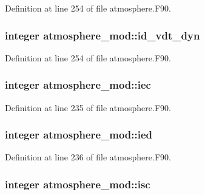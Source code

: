 Definition at line 254 of file atmosphere.\-F90.

\subsubsection[{id\-\_\-vdt\-\_\-dyn}]{\setlength{\rightskip}{0pt plus 5cm}integer atmosphere\-\_\-mod\-::id\-\_\-vdt\-\_\-dyn\hspace{0.3cm}{\ttfamily [private]}}\label{classatmosphere__mod_aa372781c11fb092462ce67e7d29f3cb0}


Definition at line 254 of file atmosphere.\-F90.

\subsubsection[{iec}]{\setlength{\rightskip}{0pt plus 5cm}integer atmosphere\-\_\-mod\-::iec\hspace{0.3cm}{\ttfamily [private]}}\label{classatmosphere__mod_ab0f4510c9097aa7a29c57c545aa02976}


Definition at line 235 of file atmosphere.\-F90.

\subsubsection[{ied}]{\setlength{\rightskip}{0pt plus 5cm}integer atmosphere\-\_\-mod\-::ied\hspace{0.3cm}{\ttfamily [private]}}\label{classatmosphere__mod_a775666c64f59edcf96c530c1fc0f1ee9}


Definition at line 236 of file atmosphere.\-F90.

\subsubsection[{isc}]{\setlength{\rightskip}{0pt plus 5cm}integer atmosphere\-\_\-mod\-::isc\hspace{0.3cm}{\ttfamily [private]}}\label{classatmosphere__mod_a1a7a45008a0aebc7bce0bc31d6ded35c}


